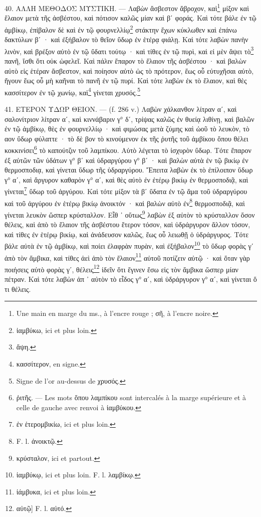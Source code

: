 \documentclass[a4paper, 11pt, oneside, polutonikogreek, french]{article}
\begin{document}
40. ΑΛΛΗ ΜΕΘΟΔΟΣ ΜΥΣΤΙΚΗ. --- Λαβὼν ἄσβεστον ἄβροχον, καὶ\footnote{Une main en marge du ms., à l'encre rouge ; σῆ, à l'encre noire.} μίξον καὶ ἔλαιον μετὰ τῆς ἀσβέστου, καὶ πότισον καλῶς μίαν καὶ βʹ φοράς. Καὶ τότε βάλε ἐν τῷ ἀμβίκῳ, ἐπίβαλον δὲ καὶ ἐν τῷ φουρνελλίῳ\footnote{ἰαμβύκω, ici et plus loin.} στάκτην ἔχων κύκλωθεν καὶ ἐπάνω δακτύλων βʹ · καὶ ἐξήβαλον τὸ θεῖον ὕδωρ ἐν ἑτέρᾳ φιάλῃ. Καὶ τότε λαβὼν πανὴν λινὸν, καὶ βρέξον αὐτὸ ἐν τῷ ὕδατι τούτῳ · καὶ τίθες ἐν τῷ πυρὶ, καὶ εἰ μὲν ἅψει τὸ\footnote{ἄψη.} πανῆ, ἴσθι ὅτι οὐκ ὠφελεῖ. Καὶ πάλιν ἔπαρον τὸ ἔλαιον τῆς ἀσβέστου · καὶ βαλὼν αὐτὸ εἰς ἑτέραν ἄσβεστον, καὶ ποίησον αὐτὸ ὡς τὸ πρότερον, ἕως οὗ εὐτυχῆσαι αὐτὸ, ἤγουν ἕως οὗ μὴ καῆναι τὸ πανῆ ἐν τῷ πυρί. Καὶ τότε λαβὼν ἐκ τὸ ἔλαιον, καὶ θὲς κασσίτερον ἐν τῷ χωνίῳ, καὶ\footnote{κασσίτερον, en signe.} γίνεται χρυσός.\footnote{Signe de l'or au-dessus de χρυσός.}

41. ΕΤΕΡΟΝ ΥΔΩΡ ΘΕΙΟΝ. --- (f. 286 v.) Λαβὼν χάλκανθον λίτραν αʹ, καὶ σαλονίτριον λίτραν αʹ, καὶ κιννάβαριν γ° δʹ, τρίψας καλῶς ἐν θυείᾳ λιθίνῃ, καὶ βαλῶν ἐν τῷ ἀμβίκῳ, θὲς ἐν φουρνελλίῳ · καὶ φιμώσας μετὰ ζύμης καὶ ὠοῦ τὸ λευκὸν, τὸ αον ὕδωρ φύλαττε · τὸ δὲ βον τὸ κινούμενον ἐκ τῆς ῥυτῆς τοῦ ἀμβίκου ὅπου θέλει κοκκινίσει\footnote{ῥιτῆς. --- Les mots ὅπου λαμπίκου sont intercalés à la marge supérieure et à celle de gauche avec renvoi à ἰαμβύκου.} τὸ καπούτζιν τοῦ λαμπίκου. Αὐτὸ λέγεται τὸ ἰσχυρὸν ὕδωρ. Τότε ἔπαρον ἐξ αὐτῶν τῶν ὑδάτων γ° βʹ καὶ ὑδραργύρου γ° βʹ · καὶ βαλὼν αὐτὰ ἐν τῷ βικίῳ ἐν θερμοσποδιᾳ, καὶ γίνεται ὕδωρ τῆς ὑδραργύρου. Ἔπειτα λαβὼν ἐκ τὸ ἐπίλοιπον ὕδωρ γ° αʹ, καὶ ἄργυρον καθαρὸν γ° αʹ, καὶ θὲς αὐτὸ ἐν ἐτέρῳ βικίῳ ἐν θερμοσποδιᾷ, καὶ γίνεται\footnote{ἐν ἑτερομβικίω, ici et plus loin.} ὕδωρ τοῦ ἀργύρου. Καὶ τότε μίξον τὰ βʹ ὕδατα ἐν τῷ ἅμα τοῦ ὑδραργύρου καὶ τοῦ ἀργύρου ἐν ἑτέρῳ βικίῳ ἀνοικτόν · καὶ βαλὼν αὐτὸ ἐν\footnote{F. l. ἀνοικτῷ.} θερμοσποδιᾷ, καὶ γίνεται λευκὸν ὥσπερ κρύσταλλον. Εἶθ ᾽ οὕτως\footnote{κρύσταλον, ici et partout.} λαβὼν ἐξ αὐτὸν τὸ κρύσταλλον ὅσον θέλεις, καὶ ἀπὸ τὸ ἔλαιον τῆς ἀσβέστου ἕτερον τόσον, καὶ ὑδράργυρον ἄλλον τόσον, καὶ τίθες ἐν ἑτέρῳ βικίῳ, καὶ ἀνάδευσον καλῶς, ἕως οὗ λειωθῇ ὁ ὑδράργυρος. Τότε βάλε αὐτὰ ἐν τῷ ἀμβίκῳ, καὶ ποίει ἐλαφρὰν πυρὰν, καὶ ἐξήβαλον\footnote{ἰαμβύκῳ, ici et plus loin. F. l. λαμβίκῳ.} τὸ ὕδωρ φορὰς γʹ ἀπὸ τὸν ἄμβικα, καὶ τίθες ἀεὶ ἀπὸ τὸν ἔλαιον\footnote{ἰάμβυκα, ici et plus loin.} αὐτοῦ ποτίζειν αὐτῷ · καὶ ὅταν γὰρ ποιήσεις αὐτὸ φορὰς γʹ, θέλεις\footnote{αὐτῷ] F. l. αὐτό.} ἰδεῖν ὅτι ἔγινεν ἔσω εἰς τὸν ἄμβικα ὥσπερ μίαν πέτραν. Καὶ τότε λαβὼν ἀπ ᾽ αὐτὸν τὸ εἶδος γ° αʹ, καὶ ὑδράργυρον γ° αʹ, καὶ γίνεται ὅ τι θέλεις.
\end{document}
